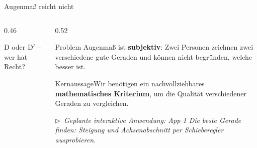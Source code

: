 \documentclass[aspectratio=169,11pt]{beamer}
\newcommand{\kernaussage}[1]{\begin{alertblock}{Kernaussage}#1\end{alertblock}}
\newcommand{\appmarker}[1]{\par{\scriptsize\color{hsbigray}$\triangleright$~\textit{Geplante interaktive Anwendung: #1}\par}}
\newcommand{\werbepunkte}{\addplot[only marks, mark=*, mark size=2.2pt, color=hsbiblue]
  coordinates {(1,33) (3,30) (4,37) (5,33) (6,38) (8,41) (8,39) (9,43) (10,45) (11,40) (12,42) (13,47)};}
\begin{document}
\begin{frame}{Augenmaß reicht nicht}
  \begin{columns}[T]
    \begin{column}{0.46\textwidth}
      \begin{center}\footnotesize
        D oder D$'$ -- wer hat Recht?
      \end{center}
    \end{column}
    \begin{column}{0.52\textwidth}
      \small
      \begin{alertblock}{Problem}
        Augenmaß ist \textbf{subjektiv}: Zwei Personen zeichnen zwei
        verschiedene \glqq gute\grqq{} Geraden und können nicht begründen,
        welche besser ist.
      \end{alertblock}
      \kernaussage{Wir benötigen ein nachvollziehbares \textbf{mathematisches
        Kriterium}, um die Qualität verschiedener Geraden zu vergleichen.}
      \appmarker{App 1 \glqq Die beste Gerade finden\grqq: Steigung und
        Achsenabschnitt per Schieberegler ausprobieren.}
    \end{column}
  \end{columns}
\end{frame}
\end{document}

